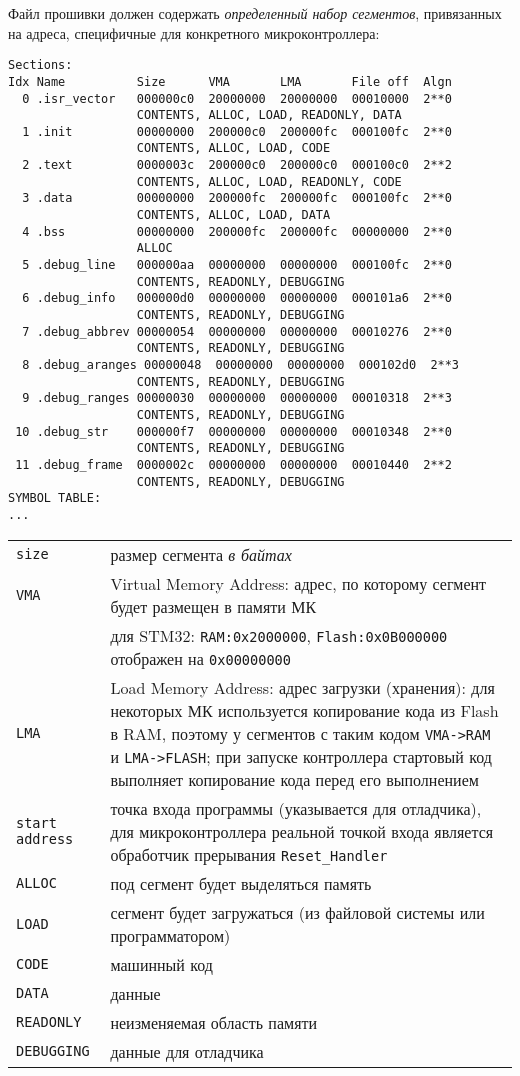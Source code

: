 \bigskip \noindent
Файл прошивки
должен содержать \emph{определенный набор сегментов}, привязанных на адреса,
специфичные для конкретного микроконтроллера:\\

\begin{lstlisting}
Sections:
Idx Name          Size      VMA       LMA       File off  Algn
  0 .isr_vector   000000c0  20000000  20000000  00010000  2**0
                  CONTENTS, ALLOC, LOAD, READONLY, DATA
  1 .init         00000000  200000c0  200000fc  000100fc  2**0
                  CONTENTS, ALLOC, LOAD, CODE
  2 .text         0000003c  200000c0  200000c0  000100c0  2**2
                  CONTENTS, ALLOC, LOAD, READONLY, CODE
  3 .data         00000000  200000fc  200000fc  000100fc  2**0
                  CONTENTS, ALLOC, LOAD, DATA
  4 .bss          00000000  200000fc  200000fc  00000000  2**0
                  ALLOC
  5 .debug_line   000000aa  00000000  00000000  000100fc  2**0
                  CONTENTS, READONLY, DEBUGGING
  6 .debug_info   000000d0  00000000  00000000  000101a6  2**0
                  CONTENTS, READONLY, DEBUGGING
  7 .debug_abbrev 00000054  00000000  00000000  00010276  2**0
                  CONTENTS, READONLY, DEBUGGING
  8 .debug_aranges 00000048  00000000  00000000  000102d0  2**3
                  CONTENTS, READONLY, DEBUGGING
  9 .debug_ranges 00000030  00000000  00000000  00010318  2**3
                  CONTENTS, READONLY, DEBUGGING
 10 .debug_str    000000f7  00000000  00000000  00010348  2**0
                  CONTENTS, READONLY, DEBUGGING
 11 .debug_frame  0000002c  00000000  00000000  00010440  2**2
                  CONTENTS, READONLY, DEBUGGING
SYMBOL TABLE:
...
\end{lstlisting}

\begin{tabular}{l p{}}
\verb|size| & размер сегмента \emph{в байтах} \\
\verb|VMA| & Virtual Memory Address: адрес, по которому сегмент будет
размещен в памяти МК\\
& для STM32: \verb|RAM:0x2000000|, \verb|Flash:0x0B000000| отображен на
\verb|0x00000000|\\
\verb|LMA| & Load Memory Address: адрес загрузки (хранения): для некоторых МК
используется копирование кода из Flash в RAM, поэтому у сегментов с таким кодом
\verb|VMA->RAM| и \verb|LMA->FLASH|;
при запуске контроллера стартовый код выполняет копирование кода перед его
выполнением\\
\verb|start address| & точка входа программы (указывается для отладчика),
для микроконтроллера реальной точкой входа является обработчик прерывания
\verb|Reset_Handler|\\
\verb|ALLOC| & под сегмент будет выделяться память \\
\verb|LOAD| & сегмент будет загружаться (из файловой системы или
программатором)\\
\verb|CODE| & машинный код \\
\verb|DATA| & данные \\
\verb|READONLY| & неизменяемая область памяти \\
\verb|DEBUGGING| & данные для отладчика \\
\end{tabular}

